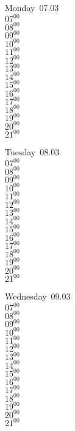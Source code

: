 \documentclass[11pt,a4paper]{book}\usepackage[]{graphicx}\usepackage[]{color}
\begin{document}
\begin{headerbox}
\end{headerbox}
\begin{weekdaybox}
  Monday~07.03\\
  { 
  \vfill
  $07^{00}$\\
$08^{00}$\\
$09^{00}$\\
$10^{00}$\\
$11^{00}$\\
$12^{00}$\\
$13^{00}$\\
$14^{00}$\\
$15^{00}$\\
$16^{00}$\\
$17^{00}$\\
$18^{00}$\\
$19^{00}$\\
$20^{00}$\\
$21^{00}$\\
  }
\end{weekdaybox}
\begin{weekdaybox}
  Tuesday~08.03\\
  { 
  \vfill
  $07^{00}$\\
$08^{00}$\\
$09^{00}$\\
$10^{00}$\\
$11^{00}$\\
$12^{00}$\\
$13^{00}$\\
$14^{00}$\\
$15^{00}$\\
$16^{00}$\\
$17^{00}$\\
$18^{00}$\\
$19^{00}$\\
$20^{00}$\\
$21^{00}$\\
  }
\end{weekdaybox}
\begin{weekdaybox}
  Wednesday~09.03\\
  { 
  \vfill
  $07^{00}$\\
$08^{00}$\\
$09^{00}$\\
$10^{00}$\\
$11^{00}$\\
$12^{00}$\\
$13^{00}$\\
$14^{00}$\\
$15^{00}$\\
$16^{00}$\\
$17^{00}$\\
$18^{00}$\\
$19^{00}$\\
$20^{00}$\\
$21^{00}$\\
  }
\end{weekdaybox}
\end{document}
